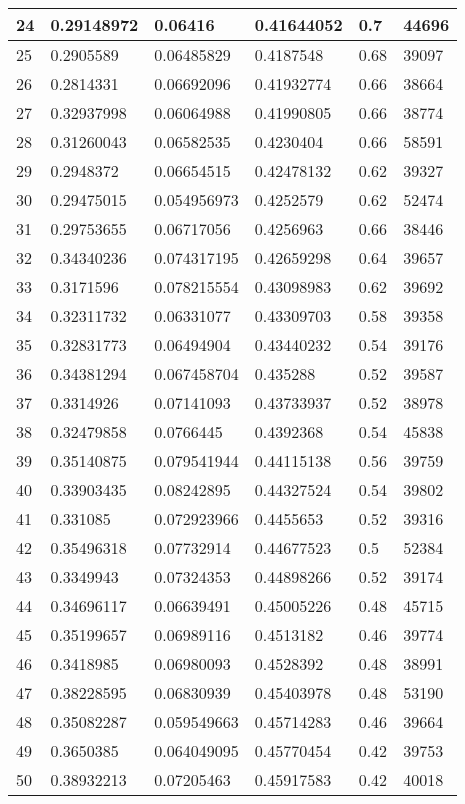 \begin{longtable}{|l|l|l|l|l|l|}
24 & 0.29148972 & 0.06416 & 0.41644052 & 0.7 & 44696 \\ \hline 
25 & 0.2905589 & 0.06485829 & 0.4187548 & 0.68 & 39097 \\ \hline 
26 & 0.2814331 & 0.06692096 & 0.41932774 & 0.66 & 38664 \\ \hline 
27 & 0.32937998 & 0.06064988 & 0.41990805 & 0.66 & 38774 \\ \hline 
28 & 0.31260043 & 0.06582535 & 0.4230404 & 0.66 & 58591 \\ \hline 
29 & 0.2948372 & 0.06654515 & 0.42478132 & 0.62 & 39327 \\ \hline 
30 & 0.29475015 & 0.054956973 & 0.4252579 & 0.62 & 52474 \\ \hline 
31 & 0.29753655 & 0.06717056 & 0.4256963 & 0.66 & 38446 \\ \hline 
32 & 0.34340236 & 0.074317195 & 0.42659298 & 0.64 & 39657 \\ \hline 
33 & 0.3171596 & 0.078215554 & 0.43098983 & 0.62 & 39692 \\ \hline 
34 & 0.32311732 & 0.06331077 & 0.43309703 & 0.58 & 39358 \\ \hline 
35 & 0.32831773 & 0.06494904 & 0.43440232 & 0.54 & 39176 \\ \hline 
36 & 0.34381294 & 0.067458704 & 0.435288 & 0.52 & 39587 \\ \hline 
37 & 0.3314926 & 0.07141093 & 0.43733937 & 0.52 & 38978 \\ \hline 
38 & 0.32479858 & 0.0766445 & 0.4392368 & 0.54 & 45838 \\ \hline 
39 & 0.35140875 & 0.079541944 & 0.44115138 & 0.56 & 39759 \\ \hline 
40 & 0.33903435 & 0.08242895 & 0.44327524 & 0.54 & 39802 \\ \hline 
41 & 0.331085 & 0.072923966 & 0.4455653 & 0.52 & 39316 \\ \hline 
42 & 0.35496318 & 0.07732914 & 0.44677523 & 0.5 & 52384 \\ \hline 
43 & 0.3349943 & 0.07324353 & 0.44898266 & 0.52 & 39174 \\ \hline 
44 & 0.34696117 & 0.06639491 & 0.45005226 & 0.48 & 45715 \\ \hline 
45 & 0.35199657 & 0.06989116 & 0.4513182 & 0.46 & 39774 \\ \hline 
46 & 0.3418985 & 0.06980093 & 0.4528392 & 0.48 & 38991 \\ \hline 
47 & 0.38228595 & 0.06830939 & 0.45403978 & 0.48 & 53190 \\ \hline 
48 & 0.35082287 & 0.059549663 & 0.45714283 & 0.46 & 39664 \\ \hline 
49 & 0.3650385 & 0.064049095 & 0.45770454 & 0.42 & 39753 \\ \hline 
50 & 0.38932213 & 0.07205463 & 0.45917583 & 0.42 & 40018 \\ \hline 
\end{longtable}